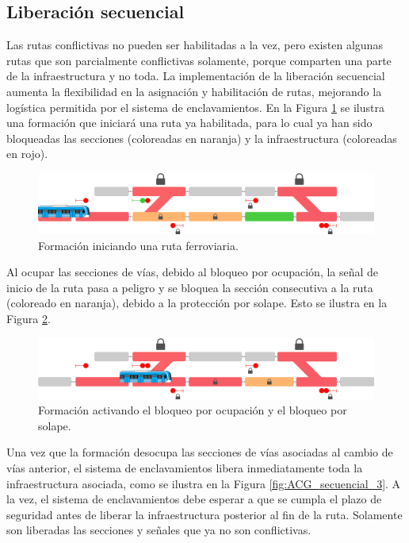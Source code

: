 \subsection{Liberación secuencial}

	\label{sec:ACG_liberacion}
	
	Las rutas conflictivas no pueden ser habilitadas a la vez, pero existen algunas rutas que son parcialmente conflictivas solamente, porque comparten una parte de la infraestructura y no toda. La implementación de la liberación secuencial aumenta la flexibilidad en la asignación y habilitación de rutas, mejorando la logística permitida por el sistema de enclavamientos. En la Figura \ref{fig:ACG_secuencial_1} se ilustra una formación que iniciará una ruta ya habilitada, para lo cual ya han sido bloqueadas las secciones (coloreadas en naranja) y la infraestructura (coloreadas en rojo).
	
	 \begin{figure}[!h]
	     \centering
	     \includegraphics[width=1\textwidth]{Figuras/secuencial_1}
	     \centering\caption{Formación iniciando una ruta ferroviaria.}
	     \label{fig:ACG_secuencial_1}
	 \end{figure}
 
	Al ocupar las secciones de vías, debido al bloqueo por ocupación, la señal de inicio de la ruta pasa a peligro y se bloquea la sección consecutiva a la ruta (coloreado en naranja), debido a la protección por solape. Esto se ilustra en la Figura \ref{fig:ACG_secuencial_2}.
	
	\begin{figure}[!h]
    	 \centering
	     \includegraphics[width=1\textwidth]{Figuras/secuencial_2}
    	 \centering\caption{Formación activando el bloqueo por ocupación y el bloqueo por solape.}
    	 \label{fig:ACG_secuencial_2}
	\end{figure}
 
 	Una vez que la formación desocupa las secciones de vías asociadas al cambio de vías anterior, el sistema de enclavamientos libera inmediatamente toda la infraestructura asociada, como se ilustra en la Figura \ref{fig:ACG_secuencial_3}. A la vez, el sistema de enclavamientos debe esperar a que se cumpla el plazo de seguridad antes de liberar la infraestructura posterior al fin de la ruta. Solamente son liberadas las secciones y señales que ya no son conflictivas.
	   
